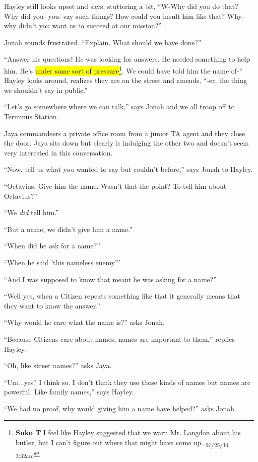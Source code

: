 Hayley still looks upset and says, stuttering a bit, ``W-Why did you do that? Why did you- you- say such things?  How could you insult him like that?  Why- why didn't you want us to succeed at our mission?''

Jonah sounds frustrated.  ``Explain.  What should we have done?''

``Answer his questions!  He was looking for answers.  He needed something to help him.  He's \hl{under some sort of pressure}\footnote{\textbf{Suko T }I feel like Hayley suggested that we warn Mr. Langdon about his butler, but I can't figure out where that might have come up. \textsubscript{07/25/14 3:32am}}.  We could have told him the name of-'' Hayley looks around, realizes they are on the street and amends, ``-er, the thing we shouldn't say in public.''

``Let's go somewhere where we can talk,'' says Jonah and we all troop off to Terminus Station.



Jaya commandeers a private office room from a junior TA agent and they close the door.  Jaya sits down but clearly is indulging the other two and doesn't seem very interested in this conversation.

``Now, tell us what you wanted to say but couldn't before,'' says Jonah to Hayley.

``Octavius.  Give him the name.  Wasn't that the point?  To tell him about Octavius?''

``We \textit{did} tell him.''

``But a name, we didn't give him a name.''

``When did he ask for a name?''

``When he said 'this nameless enemy'''

``And I was supposed to know that meant he was asking for a name?''

``Well yes, when a Citizen repeats something like that it generally means that they want to know the answer.''

``Why would he care what the name is?'' asks Jonah.

``Because Citizens care about names, names are important to them,'' replies Hayley.

``Oh, like street names?'' asks Jaya.

``Um...yes?  I think so.  I don't think they use those kinds of names but names are powerful.  Like family names,'' says Hayley.

``We had no proof, why would giving him a name have helped?'' asks Jonah

